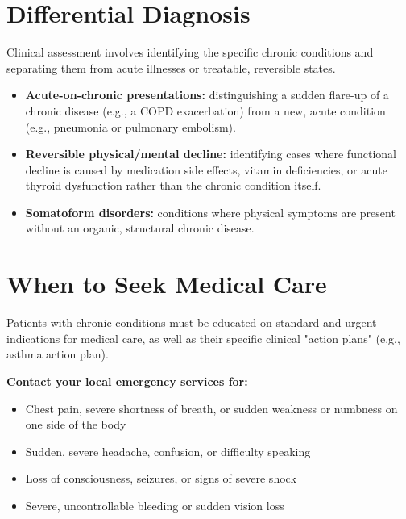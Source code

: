\section*{Differential Diagnosis}
Clinical assessment involves identifying the specific chronic conditions and separating them from acute illnesses or treatable, reversible states.
\begin{itemize}
    \item \textbf{Acute-on-chronic presentations:} distinguishing a sudden flare-up of a chronic disease (e.g., a COPD exacerbation) from a new, acute condition (e.g., pneumonia or pulmonary embolism).
    \item \textbf{Reversible physical/mental decline:} identifying cases where functional decline is caused by medication side effects, vitamin deficiencies, or acute thyroid dysfunction rather than the chronic condition itself.
    \item \textbf{Somatoform disorders:} conditions where physical symptoms are present without an organic, structural chronic disease.
\end{itemize}

\section*{When to Seek Medical Care}
Patients with chronic conditions must be educated on standard and urgent indications for medical care, as well as their specific clinical "action plans" (e.g., asthma action plan).

\textbf{Contact your local emergency services for:}
\begin{itemize}
    \item Chest pain, severe shortness of breath, or sudden weakness or numbness on one side of the body
    \item Sudden, severe headache, confusion, or difficulty speaking
    \item Loss of consciousness, seizures, or signs of severe shock
    \item Severe, uncontrollable bleeding or sudden vision loss
\end{itemize}

